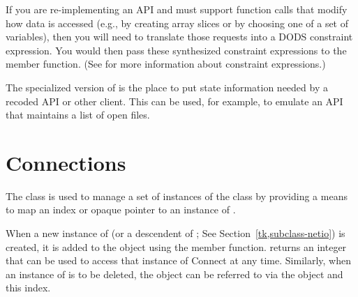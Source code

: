 
If you are re-implementing an API and must support function calls that
modify how data is accessed (e.g., by creating array slices or by
choosing one of a set of variables), then you will need to translate
those requests into a DODS constraint expression. You would then pass
these synthesized constraint expressions to the
 member function.  (See
 for more information about constraint
expressions.)

The specialized version of  is the place to put state
information needed by a recoded API or other client.  This can be
used, for example, to emulate an API that maintains a list of open
files. 

\section{Connections}

The class  is used to manage a set of instances of
the class  by providing a means to map an index or
opaque pointer to an instance of .

When a new instance of  (or a descendent of
; See Section~\ref{tk,subclass-netio}) is created, it
is added to the  object using the 
member function.  returns an integer that can be
used to access that instance of Connect at any time. Similarly, when
an instance of  is to be deleted, the object can be
referred to via the  object and this index.




